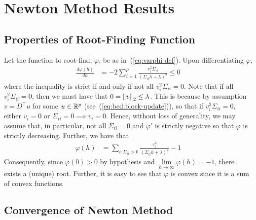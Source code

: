 \appendix

\section{Newton Method Results}\label{appendix:newton}

\subsection{Properties of Root-Finding Function}\label{appendix:properties-varphi}

Let the function to root-find, $\varphi$, be as in~(\ref{eq:varphi-def}).
Upon differentiating $\varphi$,
\begin{align*}
    \frac{d\varphi(h)}{dh}
    &=
    -2 \sum\limits_{i=1}^p
    \frac{v_i^2 \Sigma_{ii}}{(\Sigma_{ii} h + \lambda)^3}
    \leq
    0
\end{align*}
where the inequality is strict if and only if not all $v_i^2 \Sigma_{ii} = 0$.
Note that if all $v_i^2 \Sigma_{ii} = 0$, then we must have that $0 = \left\|v\right\|_2 \leq \lambda$.
This is because by assumption $v = D^\top u$ for some $u \in \mathbb{R}^p$
(see~(\ref{eq:bcd:block-update})), so that 
if $v_i^2 \Sigma_{ii} = 0$, either $v_i = 0$ or $\Sigma_{ii} = 0 \implies v_i = 0$.
Hence, without loss of generality, we may assume 
that, in particular, not all $\Sigma_{ii} = 0$ and
$\varphi'$ is strictly negative so that $\varphi$ is strictly decreasing.
Further, we have that
\begin{align*}
    \varphi(h)
    &=
    \sum\limits_{i: \Sigma_{ii} > 0}
    \frac{v_i^2}{(\Sigma_{ii} h + \lambda)^2} - 1
\end{align*}
Consequently, since $\varphi(0) > 0$ by hypothesis and
$\lim\limits_{h\to\infty} \varphi(h) = -1$,
there exists a (unique) root.
Further, it is easy to see that $\varphi$ is convex since it is a 
sum of convex functions.

\subsection{Convergence of Newton Method}\label{appendix:newton-convergence}

